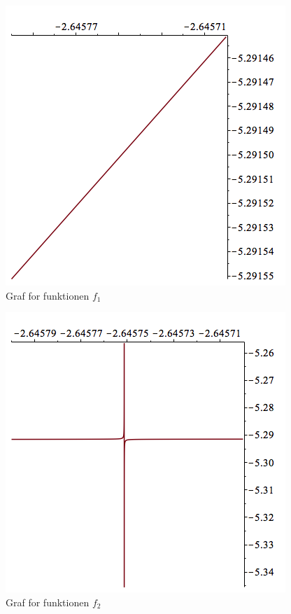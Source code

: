 \documentclass[11pt,a4paper]{article}
\begin{document}
\begin{multicols}{2}

    \begin{figure}[H]
        \center
        \includegraphics[scale=0.5]{figures/f1.png}
        \caption{Graf for funktionen $f_1$}
    \end{figure}

    \vfill\columnbreak

    \begin{figure}[H]
        \includegraphics[scale=0.5]{figures/f2.png}
        \caption{Graf for funktionen $f_2$}
    \end{figure}

\end{multicols}
\end{document}
